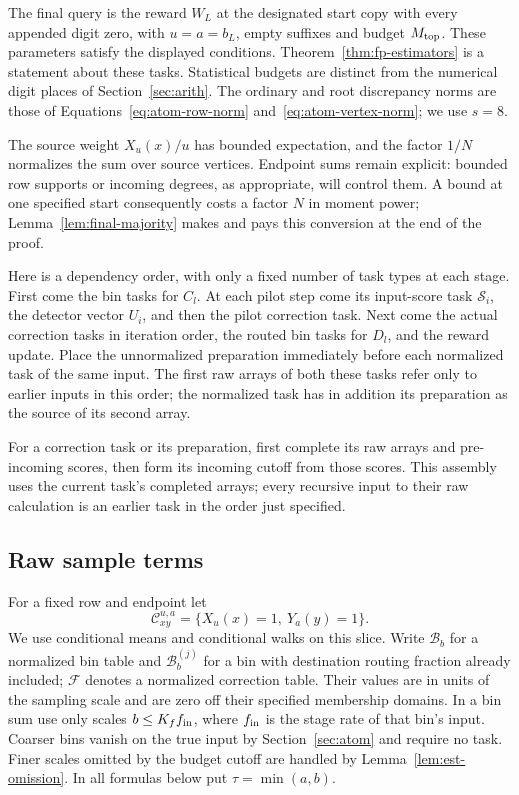 The final query is the reward $W_L$ at the designated start copy with every appended digit zero,
with $u=a=b_L$, empty suffixes and budget $M_{\rm top}$.
These parameters satisfy the displayed conditions.
Theorem~\ref{thm:fp-estimators} is a statement about these tasks.
Statistical budgets
are distinct from the numerical digit places of Section~\ref{sec:arith}.
The ordinary and root discrepancy norms are those of
Equations~\eqref{eq:atom-row-norm} and~\eqref{eq:atom-vertex-norm}; we use
$s=8$.

The source weight $X_u(x)/u$ has bounded expectation, and the factor
$1/N$ normalizes the sum over source vertices.  Endpoint sums remain
explicit: bounded row supports or incoming degrees, as appropriate,
will control them.  A bound at one specified start consequently costs
a factor $N$ in moment power; Lemma~\ref{lem:final-majority} makes and
pays this conversion at the end of the proof.

Here is a dependency order, with only a fixed number of task types at each
stage.  First come the bin tasks for $C_l$.  At each pilot step come its
input-score task $\mathcal S_i$, the detector vector $U_i$, and then the
pilot correction task.  Next come the actual correction tasks in iteration
order, the routed bin tasks for $D_l$, and the reward update.  Place the
unnormalized preparation immediately before each normalized task of the
same input.  The first raw arrays of both these tasks refer only to
earlier inputs in this order; the normalized task has in addition its
preparation as the source of its second array.

For a correction task or its preparation, first complete its raw arrays
and pre-incoming scores, then form its incoming cutoff from those scores.
This assembly uses the current task's completed arrays; every recursive
input to their raw calculation is an earlier task in the order just
specified.

\subsection{Raw sample terms}

For a fixed row and endpoint let
\[
 \mathcal C_{xy}^{u,a}=\{X_u(x)=1,\ Y_a(y)=1\}.
\]
We use conditional means and conditional walks on this slice.  Write
$\mathcal B_b$ for a normalized bin table and $\mathcal B_b^{(j)}$ for a
bin with destination routing fraction already included; $\mathcal F$
denotes a normalized correction table.  Their values are in units of the sampling scale
and are zero off their specified membership domains.  In a bin sum use
only scales $b\le K_f f_{\rm in}$, where $f_{\rm in}$ is the stage rate
of that bin's input.  Coarser bins vanish on the true input by
Section~\ref{sec:atom} and require no task.  Finer scales omitted by the
budget cutoff are handled by Lemma~\ref{lem:est-omission}.
In all formulas below put $\tau=\min(a,b)$.

